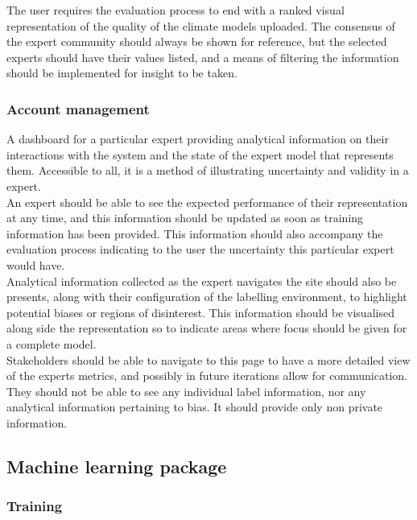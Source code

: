 \documentclass{ecmm427_assignment}
\begin{document}
\noindent The user requires the evaluation process to end with a ranked visual representation of the quality of the climate models uploaded. The consensus of the expert community should always be shown for reference, but the selected experts should have their values listed, and a means of filtering the information should be implemented for insight to be taken.

\subsubsection{Account management}

A dashboard for a particular expert providing analytical information on their interactions with the system and the state of the expert model that represents them. Accessible to all, it is a method of illustrating uncertainty and validity in a expert.\\

\noindent An expert should be able to see the expected performance of their representation at any time, and this information should be updated as soon as training information has been provided. This information should also accompany the evaluation process indicating to the user the uncertainty this particular expert would have.\\

\noindent Analytical information collected as the expert navigates the site should also be presents, along with their configuration of the labelling environment, to highlight potential biases or regions of disinterest. This information should be visualised along side the representation so to indicate areas where focus should be given for a complete model.\\

\noindent Stakeholders should be able to navigate to this page to have a more detailed view of the experts metrics, and possibly in future iterations allow for communication. They should not be able to see any individual label information, nor any analytical information pertaining to bias. It should provide only non private information.

\subsection{Machine learning package}
\subsubsection{Training}
\end{document}
